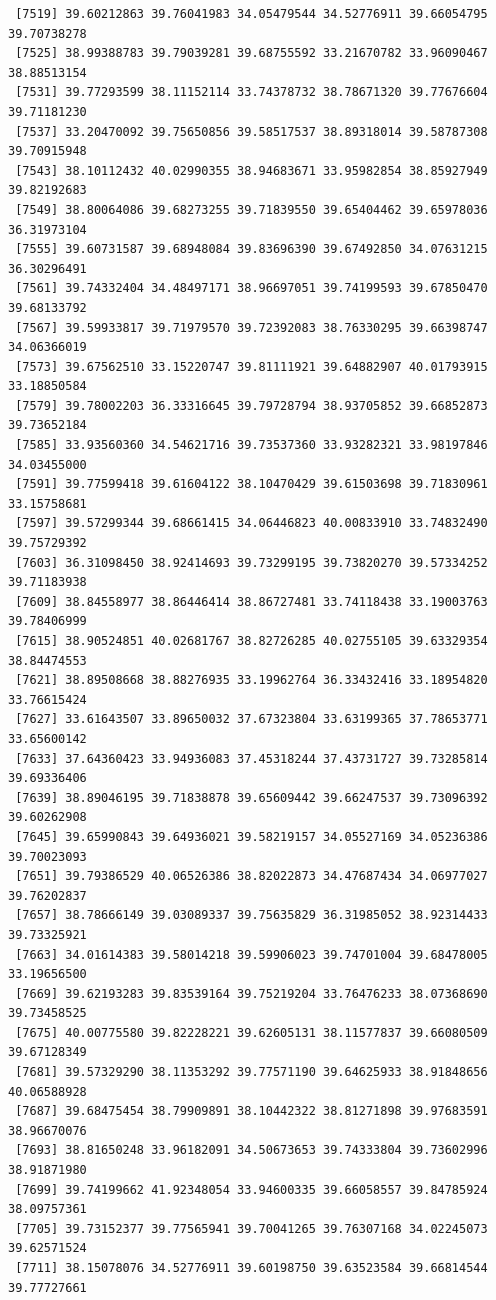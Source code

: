 \documentclass[
  letterpaper,
  DIV=11,
  numbers=noendperiod]{scrartcl}
\begin{document}
\begin{verbatim}
 [7519] 39.60212863 39.76041983 34.05479544 34.52776911 39.66054795 39.70738278
 [7525] 38.99388783 39.79039281 39.68755592 33.21670782 33.96090467 38.88513154
 [7531] 39.77293599 38.11152114 33.74378732 38.78671320 39.77676604 39.71181230
 [7537] 33.20470092 39.75650856 39.58517537 38.89318014 39.58787308 39.70915948
 [7543] 38.10112432 40.02990355 38.94683671 33.95982854 38.85927949 39.82192683
 [7549] 38.80064086 39.68273255 39.71839550 39.65404462 39.65978036 36.31973104
 [7555] 39.60731587 39.68948084 39.83696390 39.67492850 34.07631215 36.30296491
 [7561] 39.74332404 34.48497171 38.96697051 39.74199593 39.67850470 39.68133792
 [7567] 39.59933817 39.71979570 39.72392083 38.76330295 39.66398747 34.06366019
 [7573] 39.67562510 33.15220747 39.81111921 39.64882907 40.01793915 33.18850584
 [7579] 39.78002203 36.33316645 39.79728794 38.93705852 39.66852873 39.73652184
 [7585] 33.93560360 34.54621716 39.73537360 33.93282321 33.98197846 34.03455000
 [7591] 39.77599418 39.61604122 38.10470429 39.61503698 39.71830961 33.15758681
 [7597] 39.57299344 39.68661415 34.06446823 40.00833910 33.74832490 39.75729392
 [7603] 36.31098450 38.92414693 39.73299195 39.73820270 39.57334252 39.71183938
 [7609] 38.84558977 38.86446414 38.86727481 33.74118438 33.19003763 39.78406999
 [7615] 38.90524851 40.02681767 38.82726285 40.02755105 39.63329354 38.84474553
 [7621] 38.89508668 38.88276935 33.19962764 36.33432416 33.18954820 33.76615424
 [7627] 33.61643507 33.89650032 37.67323804 33.63199365 37.78653771 33.65600142
 [7633] 37.64360423 33.94936083 37.45318244 37.43731727 39.73285814 39.69336406
 [7639] 38.89046195 39.71838878 39.65609442 39.66247537 39.73096392 39.60262908
 [7645] 39.65990843 39.64936021 39.58219157 34.05527169 34.05236386 39.70023093
 [7651] 39.79386529 40.06526386 38.82022873 34.47687434 34.06977027 39.76202837
 [7657] 38.78666149 39.03089337 39.75635829 36.31985052 38.92314433 39.73325921
 [7663] 34.01614383 39.58014218 39.59906023 39.74701004 39.68478005 33.19656500
 [7669] 39.62193283 39.83539164 39.75219204 33.76476233 38.07368690 39.73458525
 [7675] 40.00775580 39.82228221 39.62605131 38.11577837 39.66080509 39.67128349
 [7681] 39.57329290 38.11353292 39.77571190 39.64625933 38.91848656 40.06588928
 [7687] 39.68475454 38.79909891 38.10442322 38.81271898 39.97683591 38.96670076
 [7693] 38.81650248 33.96182091 34.50673653 39.74333804 39.73602996 38.91871980
 [7699] 39.74199662 41.92348054 33.94600335 39.66058557 39.84785924 38.09757361
 [7705] 39.73152377 39.77565941 39.70041265 39.76307168 34.02245073 39.62571524
 [7711] 38.15078076 34.52776911 39.60198750 39.63523584 39.66814544 39.77727661

\end{verbatim}
\end{document}
